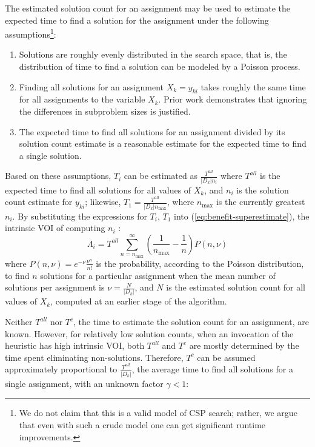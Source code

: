 The estimated solution count for an assignment may be used to estimate
the expected time to find a solution for the assignment under the
following assumptions\footnote{We do not claim
that this is a valid model of CSP search; rather, we argue that even with such a crude model
one can get significant runtime improvements.}:
\begin{enumerate}
\item Solutions are roughly evenly distributed in the search space, that is,
   the distribution of time to find a solution can be modeled by a
   Poisson process.
\item Finding all solutions for an assignment $X_{k}=y_{ki}$
takes roughly the same time for all assignments to the variable $X_k$. Prior work
   \cite{Meisels.solcount,Kask.solcount} demonstrates that
   ignoring the differences in subproblem sizes is justified.
\item The expected time to find all solutions for an assignment
  divided by its solution count estimate is a
  reasonable estimate for the expected time to find a single solution. 
\end{enumerate}
Based on these assumptions, $T_i$ can be estimated as $\frac {T^{all}}
{|D_k|n_i}$ where $T^{all}$ is the expected time to find all
solutions for all values of $X_k$, and $n_i$ is the
solution count estimate for $y_{ki}$; likewise, $T_1=\frac
{T^{all}} {|D_k|n_\mathrm{max}}$, where $n_\mathrm{max}$ is the currently
greatest $n_i$.  By substituting the expressions for
$T_i$, $T_1$ into (\ref{eq:benefit-superestimate}), 
the intrinsic VOI of computing $n_i$ :
\begin{equation}
\label{eq:benefit-estimate-sc}
\Lambda_i=T^{all} \sum_{n=n_\mathrm{max}}^\infty\left(
  \frac 1 {n_\mathrm{max}} - \frac 1 n\right) P(n, \nu)
\end{equation}
where $P(n, \nu)=e^{-\nu}\frac {\nu^n} {n!}$ is the probability,
according to the Poisson distribution, to find $n$ solutions for a
particular assignment when the mean number of solutions per assignment
is $\nu=\frac N {|D_k|}$, and $N$ is the estimated solution count for
all values of $X_k$, computed at an earlier stage of the algorithm.

Neither $T^{all}$ nor $T^c$, the time to estimate the solution count
for an assignment, are known. However, for relatively low solution
counts, when an invocation of the heuristic has high intrinsic VOI, both
$T^{all}$ and $T^c$ are mostly determined by the time spent eliminating
non-solutions. Therefore, $T^c$ can be assumed approximately proportional
to $\frac {T^{all}} {|D_k|}$, the average time to find all solutions
for a single assignment, with an unknown factor $\gamma < 1$:

